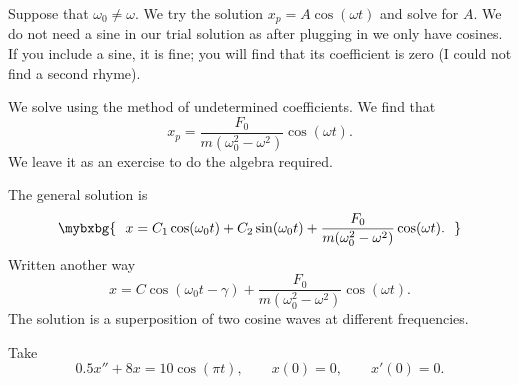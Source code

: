 Suppose that $\omega_0 \not= \omega$.  We try the solution
$x_p = A \cos (\omega t)$ and solve for $A$.  We do not need a sine
in our trial solution as after plugging in we only have cosines.
If you include a sine, it is fine; you will find that its
coefficient is zero (I could not find a second rhyme).

We solve using the method of undetermined coefficients.  We find that
\begin{equation*}
x_p = \frac{F_0}{m(\omega_0^2 - \omega^2)} \cos (\omega t) .
\end{equation*}
We leave it as an exercise to do the algebra required.

The general solution is
\begin{equation*}
\mybxbg{
~~
x = C_1 \cos (\omega_0 t) + C_2 \sin (\omega_0 t) +
\frac{F_0}{m(\omega_0^2 - \omega^2)} \cos (\omega t) .
~~
}
\end{equation*}
Written another way
\begin{equation*}
x = C \cos (\omega_0 t - \gamma) +
\frac{F_0}{m(\omega_0^2 - \omega^2)} \cos (\omega t) .
\end{equation*}
The solution is a superposition of two cosine waves at different frequencies.
\pagebreak[2]

\begin{example}
Take
\begin{equation*}
0.5 x'' + 8 x = 10 \cos (\pi t), \qquad x(0)=0, \qquad x'(0)=0 .
\end{equation*}
\end{example}

